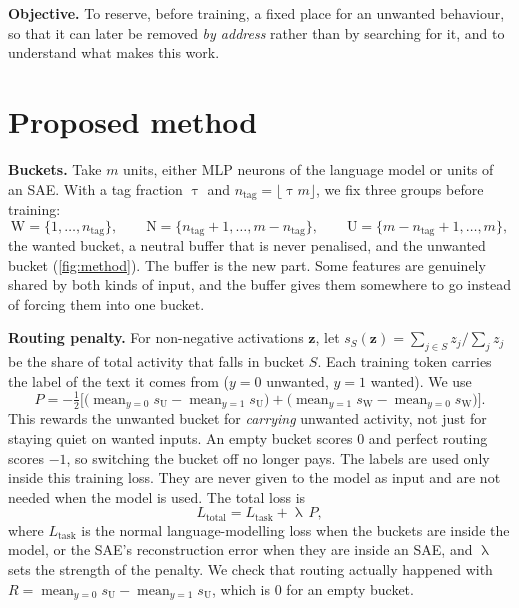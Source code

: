 \documentclass[11pt,a4paper]{article}
\newcommand{\z}{\mathbf{z}}
\newcommand{\Wb}{\mathrm{W}}      %
\newcommand{\Nb}{\mathrm{N}}      %
\newcommand{\Ub}{\mathrm{U}}      %
\newcommand{\ntag}{n_{\mathrm{tag}}}
\newcommand{\avg}{\operatorname{mean}}
\begin{document}
\textbf{Objective.} To reserve, before training, a fixed place for an unwanted behaviour, so that it
can later be removed \emph{by address} rather than by searching for it, and to understand what makes
this work.

\section{Proposed method}

\textbf{Buckets.} Take $m$ units, either MLP neurons of the language model or units of an SAE. With a
tag fraction $\uptau$ and $\ntag=\lfloor\uptau m\rfloor$, we fix three groups before training:
\begin{equation}
  \Wb=\{1,\dots,\ntag\},\qquad
  \Nb=\{\ntag+1,\dots,m-\ntag\},\qquad
  \Ub=\{m-\ntag+1,\dots,m\},
\end{equation}
the wanted bucket, a neutral buffer that is never penalised, and the unwanted bucket
(\cref{fig:method}). The buffer is the new part. Some features are genuinely shared by both kinds of
input, and the buffer gives them somewhere to go instead of forcing them into one bucket.

\textbf{Routing penalty.} For non-negative activations $\z$, let $s_S(\z)=\sum_{j\in S}z_j\big/\sum_j z_j$
be the share of total activity that falls in bucket $S$. Each training token carries the label of the
text it comes from ($y=0$ unwanted, $y=1$ wanted). We use
\begin{equation}
  P=-\tfrac12\Big[\big(\avg_{y=0}s_{\Ub}-\avg_{y=1}s_{\Ub}\big)+\big(\avg_{y=1}s_{\Wb}-\avg_{y=0}s_{\Wb}\big)\Big].
  \label{eq:penalty}
\end{equation}
This rewards the unwanted bucket for \emph{carrying} unwanted activity, not just for staying quiet on
wanted inputs. An empty bucket scores $0$ and perfect routing scores $-1$, so switching the bucket off
no longer pays. The labels are used only inside this training loss. They are never given to the
model as input and are not needed when the model is used. The total loss is
\begin{equation}
  L_{\mathrm{total}}=L_{\mathrm{task}}+\uplambda\,P ,
\end{equation}
where $L_{\mathrm{task}}$ is the normal language-modelling loss when the buckets are inside the model,
or the SAE's reconstruction error when they are inside an SAE, and $\uplambda$ sets the strength of the
penalty. We check that routing actually happened with
$R=\avg_{y=0}s_{\Ub}-\avg_{y=1}s_{\Ub}$, which is $0$ for an empty bucket.
\end{document}
